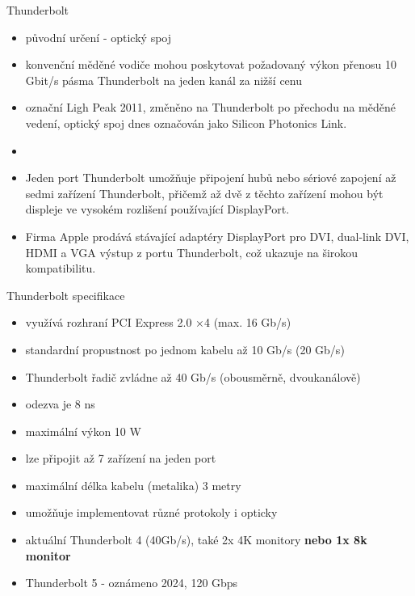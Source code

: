 \documentclass[aspectratio=43]{beamer}
\begin{document}
\begin{frame}{Thunderbolt}
	\begin{itemize}
		\item původní určení - optický spoj
		\item konvenční měděné vodiče mohou poskytovat požadovaný výkon přenosu 10 Gbit/s pásma Thunderbolt na jeden kanál za nižší cenu
		\item označní Ligh Peak 2011, změněno na Thunderbolt po přechodu na měděné vedení, optický spoj dnes označován jako Silicon Photonics Link.
		\item 
	\end{itemize}
	\vfill
	
	\begin{itemize}
		\item  Jeden port Thunderbolt umožňuje připojení hubů nebo sériové zapojení až sedmi zařízení Thunderbolt, přičemž až dvě z těchto zařízení mohou být displeje ve vysokém rozlišení používající DisplayPort. 
		\item Firma Apple prodává stávající adaptéry DisplayPort pro DVI, dual-link DVI, HDMI a VGA výstup z portu Thunderbolt, což ukazuje na širokou kompatibilitu.
	\end{itemize}
	
\end{frame}
\begin{frame}{Thunderbolt specifikace}
	\begin{itemize}
		\item využívá rozhraní PCI Express 2.0 ×4 (max. 16 Gb/s) 
		\item standardní propustnost po jednom kabelu až 10 Gb/s (20 Gb/s) 
		\item Thunderbolt řadič zvládne až 40 Gb/s (obousměrně, dvoukanálově) 
		\item odezva je 8 ns 
		\item maximální výkon 10 W 
		\item lze připojit až 7 zařízení na jeden port 
		\item maximální délka kabelu (metalika) 3 metry 
		\item umožňuje implementovat různé protokoly i opticky
        \item aktuální Thunderbolt 4 (40Gb/s), také 2x 4K monitory \textbf{nebo 1x 8k monitor}
        \item Thunderbolt 5 - oznámeno 2024, 120 Gbps
	\end{itemize}
\end{frame}
\end{document}
